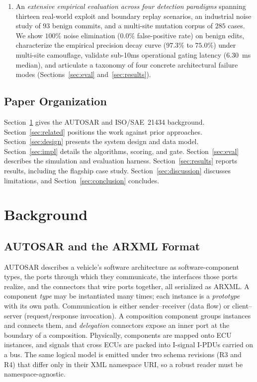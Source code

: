 \documentclass[journal]{IEEEtran}
\begin{document}
\begin{enumerate}
\item An \emph{extensive empirical evaluation across four detection paradigms} spanning thirteen real-world exploit and boundary replay scenarios, an industrial noise study of $93$ benign commits, and a multi-site mutation corpus of $285$ cases. We show $100\%$ noise elimination ($0.0\%$ false-positive rate) on benign edits, characterize the empirical precision decay curve ($97.3\%$ to $75.0\%$) under multi-site camouflage, validate sub-10ms operational gating latency ($6.30$~ms median), and articulate a taxonomy of four concrete architectural failure modes (Sections~\ref{sec:eval} and~\ref{sec:results}).
\end{enumerate}

\subsection{Paper Organization}
Section~\ref{sec:background} gives the AUTOSAR and ISO/SAE~21434 background.
Section~\ref{sec:related} positions the work against prior approaches.
Section~\ref{sec:design} presents the system design and data model.
Section~\ref{sec:impl} details the algorithms, scoring, and gate.
Section~\ref{sec:eval} describes the simulation and evaluation harness.
Section~\ref{sec:results} reports results, including the flagship case study.
Section~\ref{sec:discussion} discusses limitations, and
Section~\ref{sec:conclusion} concludes.

\section{Background}
\label{sec:background}

\subsection{AUTOSAR and the ARXML Format}
AUTOSAR describes a vehicle's software architecture as software-component types,
the ports through which they communicate, the interfaces those ports realize,
and the connectors that wire ports together, all serialized as ARXML. A
component \emph{type} may be instantiated many times; each instance is a
\emph{prototype} with its own path. Communication is either sender--receiver
(data flow) or client--server (request/response invocation). A composition
component groups instances and connects them, and \emph{delegation} connectors
expose an inner port at the boundary of a composition. Physically, components
are mapped onto ECU instances, and signals that cross ECUs are packed into
I-signal I-PDUs carried on a bus. The same logical model is emitted under two
schema revisions (R3 and R4) that differ only in their XML namespace URI, so a
robust reader must be namespace-agnostic.
\end{document}

